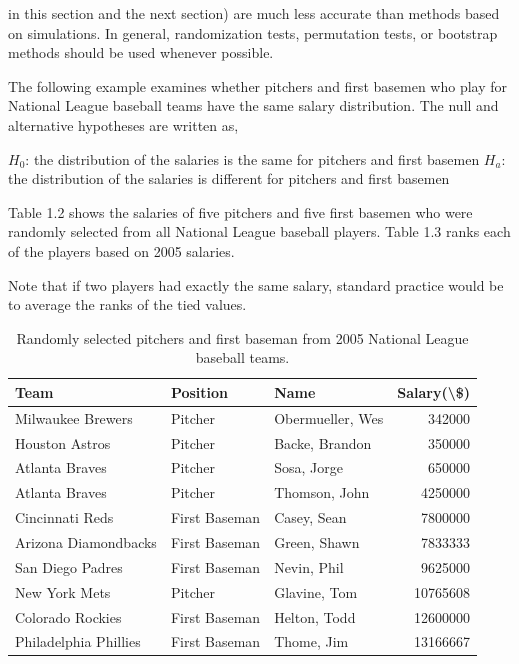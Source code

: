 \documentclass[
]{report}
\begin{document}
in this section and the next section) are much less accurate than methods based on simulations. In general, randomization tests, permutation tests, or bootstrap methods should be used whenever possible.

The following example examines whether pitchers and first basemen who play for National League baseball teams have the same salary distribution. The null and alternative hypotheses are written as,

\(H_0\): the distribution of the salaries is the same for pitchers and first basemen
\(H_a\): the distribution of the salaries is different for pitchers and first basemen

Table 1.2 shows the salaries of five pitchers and five first basemen who were randomly selected from all National League baseball players. Table 1.3 ranks each of the players based on 2005 salaries.

Note that if two players had exactly the same salary, standard practice would be to average the ranks of the tied values.

\begin{table}

\caption{\label{tab:table2}Randomly selected pitchers and first baseman from 2005 National League baseball teams.}
\centering
\begin{tabular}[t]{lllr}
\toprule
Team & Position & Name & Salary(\textbackslash{}\$)\\
\midrule
Milwaukee Brewers & Pitcher & Obermueller, Wes & 342000\\
Houston Astros & Pitcher & Backe, Brandon & 350000\\
Atlanta Braves & Pitcher & Sosa, Jorge & 650000\\
Atlanta Braves & Pitcher & Thomson, John & 4250000\\
Cincinnati Reds & First Baseman & Casey, Sean & 7800000\\
\addlinespace
Arizona Diamondbacks & First Baseman & Green, Shawn & 7833333\\
San Diego Padres & First Baseman & Nevin, Phil & 9625000\\
New York Mets & Pitcher & Glavine, Tom & 10765608\\
Colorado Rockies & First Baseman & Helton, Todd & 12600000\\
Philadelphia Phillies & First Baseman & Thome, Jim & 13166667\\
\bottomrule
\end{tabular}
\end{table}
\end{document}
